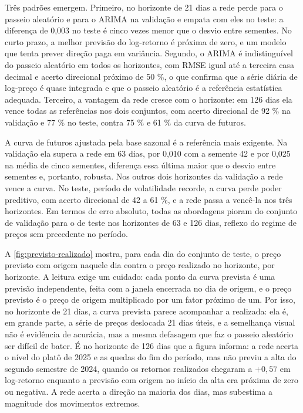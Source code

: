 Três padrões emergem. Primeiro, no horizonte de 21 dias a rede perde para o passeio aleatório e para o ARIMA na validação e empata com eles no teste: a diferença de 0,003 no teste é cinco vezes menor que o desvio entre sementes. No curto prazo, a melhor previsão do log-retorno é próxima de zero, e um modelo que tenta prever direção paga em variância. Segundo, o ARIMA é indistinguível do passeio aleatório em todos os horizontes, com RMSE igual até a terceira casa decimal e acerto direcional próximo de 50 \%, o que confirma que a série diária de log-preço é quase integrada e que o passeio aleatório é a referência estatística adequada. Terceiro, a vantagem da rede cresce com o horizonte: em 126 dias ela vence todas as referências nos dois conjuntos, com acerto direcional de 92 \% na validação e 77 \% no teste, contra 75 \% e 61 \% da curva de futuros.

A curva de futuros ajustada pela base sazonal é a referência mais exigente. Na validação ela supera a rede em 63 dias, por 0,010 com a semente 42 e por 0,025 na média de cinco sementes, diferença essa última maior que o desvio entre sementes e, portanto, robusta. Nos outros dois horizontes da validação a rede vence a curva. No teste, período de volatilidade recorde, a curva perde poder preditivo, com acerto direcional de 42 a 61 \%, e a rede passa a vencê-la nos três horizontes. Em termos de erro absoluto, todas as abordagens pioram do conjunto de validação para o de teste nos horizontes de 63 e 126 dias, reflexo do regime de preços sem precedente no período.

A \autoref{fig:previsto-realizado} mostra, para cada dia do conjunto de teste, o preço previsto com origem naquele dia contra o preço realizado no horizonte, por horizonte. A leitura exige um cuidado: cada ponto da curva prevista é uma previsão independente, feita com a janela encerrada no dia de origem, e o preço previsto é o preço de origem multiplicado por um fator próximo de um. Por isso, no horizonte de 21 dias, a curva prevista parece acompanhar a realizada: ela é, em grande parte, a série de preços deslocada 21 dias úteis, e a semelhança visual não é evidência de acurácia, mas a mesma defasagem que faz o passeio aleatório ser difícil de bater. É no horizonte de 126 dias que a figura informa: a rede acerta o nível do platô de 2025 e as quedas do fim do período, mas não previu a alta do segundo semestre de 2024, quando os retornos realizados chegaram a $+0{,}57$ em log-retorno enquanto a previsão com origem no início da alta era próxima de zero ou negativa. A rede acerta a direção na maioria dos dias, mas subestima a magnitude dos movimentos extremos.

